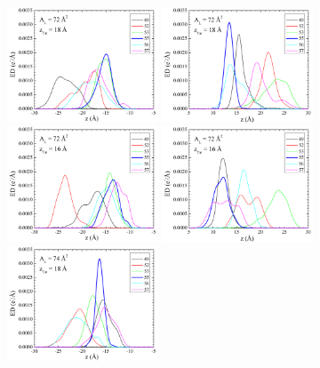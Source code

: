 \begin{figure}[htbp]
  \centering
  \includegraphics[width=0.4\textwidth]{figures/Tat/MD_Results/guanidinium/dopc-tat2_guan_72-0_L}
  \includegraphics[width=0.4\textwidth]{figures/Tat/MD_Results/guanidinium/dopc-tat2_guan_72-0_R}
  \includegraphics[width=0.4\textwidth]{figures/Tat/MD_Results/guanidinium/dopc-tat2_guan_72-1_L}
  \includegraphics[width=0.4\textwidth]{figures/Tat/MD_Results/guanidinium/dopc-tat2_guan_72-1_R}
  \includegraphics[width=0.4\textwidth]{figures/Tat/MD_Results/guanidinium/dopc-tat2_guan_74-0_L}

\end{figure}

